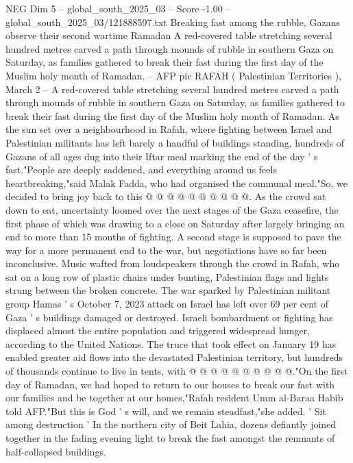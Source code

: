\begin{textsample}{NEG Dim 5 – global\_south\_2025\_03 – Score -1.00 – global\_south\_2025\_03/121888597.txt}  \label{ex:f5_neg_271}
Breaking fast among the rubble, Gazans observe their second wartime Ramadan A red-covered table stretching several hundred metres carved a path through mounds of rubble in southern Gaza on Saturday, as families gathered to break their fast during the first day of the Muslim holy month of Ramadan. -- AFP pic RAFAH ( Palestinian Territories ), March 2 -- A red-covered table stretching several hundred metres carved a path through mounds of rubble in southern Gaza on Saturday, as families gathered to break their fast during the first day of the Muslim holy month of Ramadan.
As the sun set over a neighbourhood in Rafah, where fighting between Israel and Palestinian militants has left barely a handful of buildings standing, hundreds of Gazans of all ages dug into their Iftar meal marking the end of the day ' s fast."People are deeply saddened, and everything around us feels heartbreaking,"said Malak Fadda, who had organised the communal meal."So, we decided to bring joy back to this @ @ @ @ @ @ @ @ @ @.
As the crowd sat down to eat, uncertainty loomed over the next stages of the Gaza ceasefire, the first phase of which was drawing to a close on Saturday after largely bringing an end to more than 15 months of fighting.
A second stage is supposed to pave the way for a more permanent end to the war, but negotiations have so far been inconclusive.
Music wafted from loudspeakers through the crowd in Rafah, who sat on a long row of plastic chairs under bunting, Palestinian flags and lights strung between the broken concrete.
The war sparked by Palestinian militant group Hamas ' s October 7, 2023 attack on Israel has left over 69 per cent of Gaza ' s buildings damaged or destroyed.
Israeli bombardment or fighting has displaced almost the entire population and triggered widespread hunger, according to the United Nations.
The truce that took effect on January 19 has enabled greater aid flows into the devastated Palestinian territory, but hundreds of thousands continue to live in tents, with @ @ @ @ @ @ @ @ @ @."On the first day of Ramadan, we had hoped to return to our houses to break our fast with our families and be together at our homes,"Rafah resident Umm al-Baraa Habib told AFP."But this is God ' s will, and we remain steadfast,"she added. ' Sit among destruction ' In the northern city of Beit Lahia, dozens defiantly joined together in the fading evening light to break the fast amongst the remnants of half-collapsed buildings.

\end{textsample}
